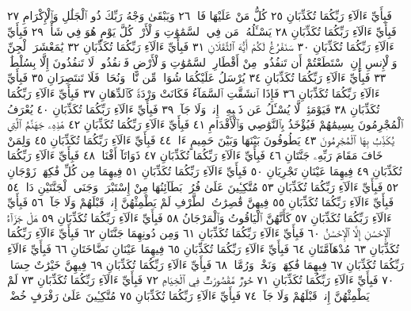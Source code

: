 فَبِأَيِّ ءَالَآءِ رَبِّكُمَا تُكَذِّبَانِ ٢٥ كُلُّ مَنْ عَلَيْهَا فَانࣲ ٢٦ وَيَبْقَىٰ وَجْهُ
رَبِّكَ ذُو ٱلْجَلَٰلِ وَٱلْإِكْرَامِ ٢٧ فَبِأَيِّ ءَالَآءِ رَبِّكُمَا تُكَذِّبَانِ ٢٨
يَسْـَٔلُهُۥ مَن فِي ٱلسَّمَٰوَٰتِ وَٱلْأَرْضِۚ كُلَّ يَوْمٍ هُوَ فِي شَأْنࣲ ٢٩ فَبِأَيِّ
ءَالَآءِ رَبِّكُمَا تُكَذِّبَانِ ٣٠ سَنَفْرُغُ لَكُمْ أَيُّهَ ٱلثَّقَلَانِ ٣١ فَبِأَيِّ
ءَالَآءِ رَبِّكُمَا تُكَذِّبَانِ ٣٢ يَٰمَعْشَرَ ٱلْجِنِّ وَٱلْإِنسِ إِنِ ٱسْتَطَعْتُمْ
أَن تَنفُذُوا۟ مِنْ أَقْطَارِ ٱلسَّمَٰوَٰتِ وَٱلْأَرْضِ فَٱنفُذُوا۟ۚ لَا تَنفُذُونَ
إِلَّا بِسُلْطَٰنࣲ ٣٣ فَبِأَيِّ ءَالَآءِ رَبِّكُمَا تُكَذِّبَانِ ٣٤ يُرْسَلُ عَلَيْكُمَا
شُوَاظࣱ مِّن نَّارࣲ وَنُحَاسࣱ فَلَا تَنتَصِرَانِ ٣٥ فَبِأَيِّ ءَالَآءِ رَبِّكُمَا
تُكَذِّبَانِ ٣٦ فَإِذَا ٱنشَقَّتِ ٱلسَّمَآءُ فَكَانَتْ وَرْدَةࣰ كَٱلدِّهَانِ ٣٧
فَبِأَيِّ ءَالَآءِ رَبِّكُمَا تُكَذِّبَانِ ٣٨ فَيَوْمَئِذࣲ لَّا يُسْـَٔلُ عَن
ذَنۢبِهِۦٓ إِنسࣱ وَلَا جَآنࣱّ ٣٩ فَبِأَيِّ ءَالَآءِ رَبِّكُمَا تُكَذِّبَانِ ٤٠
يُعْرَفُ ٱلْمُجْرِمُونَ بِسِيمَٰهُمْ فَيُؤْخَذُ بِٱلنَّوَٰصِي وَٱلْأَقْدَامِ ٤١
فَبِأَيِّ ءَالَآءِ رَبِّكُمَا تُكَذِّبَانِ ٤٢ هَٰذِهِۦ جَهَنَّمُ ٱلَّتِي يُكَذِّبُ بِهَا
ٱلْمُجْرِمُونَ ٤٣ يَطُوفُونَ بَيْنَهَا وَبَيْنَ حَمِيمٍ ءَانࣲ ٤٤ فَبِأَيِّ ءَالَآءِ
رَبِّكُمَا تُكَذِّبَانِ ٤٥ وَلِمَنْ خَافَ مَقَامَ رَبِّهِۦ جَنَّتَانِ ٤٦ فَبِأَيِّ ءَالَآءِ
رَبِّكُمَا تُكَذِّبَانِ ٤٧ ذَوَاتَآ أَفْنَانࣲ ٤٨ فَبِأَيِّ ءَالَآءِ رَبِّكُمَا تُكَذِّبَانِ ٤٩
فِيهِمَا عَيْنَانِ تَجْرِيَانِ ٥٠ فَبِأَيِّ ءَالَآءِ رَبِّكُمَا تُكَذِّبَانِ ٥١ فِيهِمَا
مِن كُلِّ فَٰكِهَةࣲ زَوْجَانِ ٥٢ فَبِأَيِّ ءَالَآءِ رَبِّكُمَا تُكَذِّبَانِ ٥٣ مُتَّكِـِٔينَ
عَلَىٰ فُرُشِۭ بَطَآئِنُهَا مِنْ إِسْتَبْرَقࣲۚ وَجَنَى ٱلْجَنَّتَيْنِ دَانࣲ ٥٤ فَبِأَيِّ
ءَالَآءِ رَبِّكُمَا تُكَذِّبَانِ ٥٥ فِيهِنَّ قَٰصِرَٰتُ ٱلطَّرْفِ لَمْ يَطْمِثْهُنَّ
إِنسࣱ قَبْلَهُمْ وَلَا جَآنࣱّ ٥٦ فَبِأَيِّ ءَالَآءِ رَبِّكُمَا تُكَذِّبَانِ ٥٧ كَأَنَّهُنَّ
ٱلْيَاقُوتُ وَٱلْمَرْجَانُ ٥٨ فَبِأَيِّ ءَالَآءِ رَبِّكُمَا تُكَذِّبَانِ ٥٩
هَلْ جَزَآءُ ٱلْإِحْسَٰنِ إِلَّا ٱلْإِحْسَٰنُ ٦٠ فَبِأَيِّ ءَالَآءِ رَبِّكُمَا
تُكَذِّبَانِ ٦١ وَمِن دُونِهِمَا جَنَّتَانِ ٦٢ فَبِأَيِّ ءَالَآءِ رَبِّكُمَا
تُكَذِّبَانِ ٦٣ مُدْهَآمَّتَانِ ٦٤ فَبِأَيِّ ءَالَآءِ رَبِّكُمَا تُكَذِّبَانِ ٦٥
فِيهِمَا عَيْنَانِ نَضَّاخَتَانِ ٦٦ فَبِأَيِّ ءَالَآءِ رَبِّكُمَا تُكَذِّبَانِ ٦٧
فِيهِمَا فَٰكِهَةࣱ وَنَخْلࣱ وَرُمَّانࣱ ٦٨ فَبِأَيِّ ءَالَآءِ رَبِّكُمَا تُكَذِّبَانِ ٦٩
فِيهِنَّ خَيْرَٰتٌ حِسَانࣱ ٧٠ فَبِأَيِّ ءَالَآءِ رَبِّكُمَا تُكَذِّبَانِ ٧١
حُورࣱ مَّقْصُورَٰتࣱ فِي ٱلْخِيَامِ ٧٢ فَبِأَيِّ ءَالَآءِ رَبِّكُمَا
تُكَذِّبَانِ ٧٣ لَمْ يَطْمِثْهُنَّ إِنسࣱ قَبْلَهُمْ وَلَا جَآنࣱّ ٧٤ فَبِأَيِّ
ءَالَآءِ رَبِّكُمَا تُكَذِّبَانِ ٧٥ مُتَّكِـِٔينَ عَلَىٰ رَفْرَفٍ خُضْرࣲ
